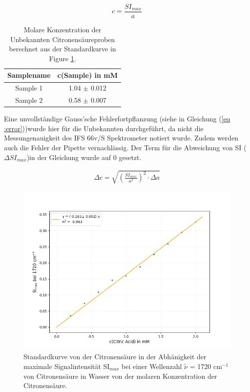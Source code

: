 \documentclass[10pt,a4paper]{article}
\begin{document}
			\begin{equation}\label{eq: concbest}
				c = \frac{SI_{max}}{a}
			\end{equation}
			
			\begin{table}[H]
				\centering
				\caption{Molare Konzentration der Unbekannten Citronensäureproben berechnet aus der Standardkurve in Figure \ref{fig:Standardcurve}.}
				\label{tab:sampleconc}
				\begin{tabular}{cc}
					\toprule
					Samplename & c(Sample) in mM\\
					\midrule
					Sample 1 & 1.04 $\pm$ 0.012\\
					Sample 2 & 0.58 $\pm$ 0.007\\
					\bottomrule
				\end{tabular}
			\end{table}	

			Eine unvollständige Gauss'sche Fehlerfortpflanzung (siehe in Gleichung (\ref{eq :error}))wurde hier für die Unbekannten durchgeführt, da nicht die Messungenauigkeit des IFS 66v/S Spektrometer notiert wurde. Zudem werden auch die Fehler der Pipette vernachlässig. Der Term für die Abweichung von SI ($\Delta SI_{max}$)in der Gleichung wurde auf 0 gesetzt.
			
			\begin{equation}\label{eq :error}
				\begin{split}
					\Delta c = \sqrt{\left( \frac{SI_{max}}{a^2}\right)^2 \cdot \Delta a}
				\end{split}
			\end{equation}
			
		\begin{figure}[H]
			\centering
			\includegraphics[scale=0.65]{Standardcurve_Fit.png}
			\caption{Standardkurve von der Citronensäure in der Abhänigkeit der maximale Signalintensität  SI$_{max}$ bei einer Wellenzahl $\tilde{\nu}$ = 1720 cm$^{-1}$ von Citronensäure in Wasser von der molaren Konzentration der Citronensäure. }
			\label{fig:Standardcurve}
		\end{figure}
		
\end{document}

